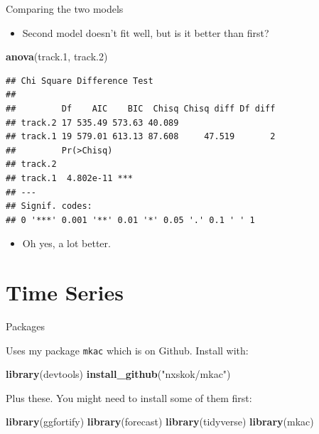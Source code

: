 \documentclass[ignorenonframetext,]{beamer}
\newenvironment{Shaded}{\begin{snugshade}}{\end{snugshade}}
\newcommand{\FloatTok}[1]{\textcolor[rgb]{0.00,0.00,0.81}{#1}}
\newcommand{\KeywordTok}[1]{\textcolor[rgb]{0.13,0.29,0.53}{\textbf{#1}}}
\newcommand{\NormalTok}[1]{#1}
\newcommand{\StringTok}[1]{\textcolor[rgb]{0.31,0.60,0.02}{#1}}
\providecommand{\tightlist}{%
  \setlength{\itemsep}{0pt}\setlength{\parskip}{0pt}}
\begin{document}
\begin{frame}[fragile]{Comparing the two models}
\protect\hypertarget{comparing-the-two-models}{}

\begin{itemize}
\tightlist
\item
  Second model doesn't fit well, but is it better than first?
\end{itemize}

\footnotesize

\begin{Shaded}
\begin{Highlighting}[]
\KeywordTok{anova}\NormalTok{(track}\FloatTok{.1}\NormalTok{, track}\FloatTok{.2}\NormalTok{)}
\end{Highlighting}
\end{Shaded}

\begin{verbatim}
## Chi Square Difference Test
## 
##         Df    AIC    BIC  Chisq Chisq diff Df diff
## track.2 17 535.49 573.63 40.089                   
## track.1 19 579.01 613.13 87.608     47.519       2
##         Pr(>Chisq)    
## track.2               
## track.1  4.802e-11 ***
## ---
## Signif. codes:  
## 0 '***' 0.001 '**' 0.01 '*' 0.05 '.' 0.1 ' ' 1
\end{verbatim}

\normalsize

\begin{itemize}
\tightlist
\item
  Oh yes, a lot better.
\end{itemize}

\end{frame}

\hypertarget{time-series}{%
\section{Time Series}\label{time-series}}

\begin{frame}[fragile]{Packages}
\protect\hypertarget{packages-11}{}

Uses my package \texttt{mkac} which is on Github. Install with:

\begin{Shaded}
\begin{Highlighting}[]
\KeywordTok{library}\NormalTok{(devtools)}
\KeywordTok{install_github}\NormalTok{(}\StringTok{"nxskok/mkac"}\NormalTok{)}
\end{Highlighting}
\end{Shaded}

Plus these. You might need to install some of them first:

\begin{Shaded}
\begin{Highlighting}[]
\KeywordTok{library}\NormalTok{(ggfortify)}
\KeywordTok{library}\NormalTok{(forecast)}
\KeywordTok{library}\NormalTok{(tidyverse)}
\KeywordTok{library}\NormalTok{(mkac) }
\end{Highlighting}
\end{Shaded}

\end{frame}
\end{document}

